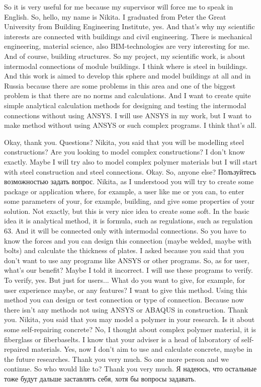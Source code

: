 \documentclass[main.tex]{subfiles}
\begin{document}
So it is very useful for me because my supervisor will force me to speak in English.
So, hello, my name is Nikita.
I graduated from Peter the Great University from Building Engineering Institute, yes.
And that's why my scientific interests are connected with buildings and civil engineering.
There is mechanical engineering, material science, also BIM-technologies are very interesting for me.
And of course, building structures.
So my project, my scientific work, is about intermodal connections of module buildings.
I think where is steel in buildings.
And this work is aimed to develop this sphere and model buildings at all and in Russia because there are some problems in this area and one of the biggest problem is that there are no norms and calculations.
And I want to create quite simple analytical calculation methods for designing and testing the intermodal connections without using ANSYS.
I will use ANSYS in my work, but I want to make method without using ANSYS or such complex programs.
I think that's all.

Okay, thank you.
Questions?
Nikita, you said that you will be modelling steel constructions?
Are you looking to model complex constructions?
I don't know exactly.
Maybe I will try also to model complex polymer materials but I will start with steel construction and steel connections.
Okay.
So, anyone else?
Пользуйтесь возможностью задать вопрос.
Nikita, as I understood you will try to create some package or application where, for example, a user like me or you can, to enter some parameters of your, for example, building, and give some properties of your solution.
Not exactly, but this is very nice idea to create some soft.
In the basic idea it is analytical method, it is formula, such as regulations, such as regulation 63.
And it will be connected only with intermodal connections.
So you have to know the forces and you can design this connection (maybe welded, maybe with bolts) and calculate the thickness of plates.
I asked because you said that you don't want to use any programs like ANSYS or other programs.
So, as for user, what's our benefit?
Maybe I told it incorrect.
I will use these programs to verify.
To verify, yes.
But just for users...
What do you want to give, for example, for user experience maybe, or any features?
I want to give this method.
Using this method you can design or test connection or type of connection.
Because now there isn't any methods not using ANSYS or ABAQUS in construction.
Thank you.
Nikita, you said that you may model a polymer in your research.
Is it about some self-repairing concrete?
No, I thought about complex polymer material, it is fiberglass or fiberbaselts.
I know that your adviser is a head of laboratory of self-repaired materials.
Yes, now I don't aim to use and calculate concrete, maybe in the future researches.
Thank you very much.
So one more person and we continue.
So who would like to? Thank you very much.
Я надеюсь, что остальные тоже будут дальше заставлять себя, хотя бы вопросы задавать.
\end{document}
